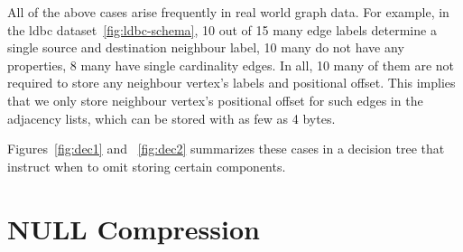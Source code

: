All of the above cases arise frequently in real world graph data. For example, in the \gls{ldbc} dataset~\ref{fig:ldbc-schema}, 10  out of 15 many edge labels determine a single source and destination neighbour label, 10 many do not have any properties, 8 many have single cardinality edges. In all, 10 many of them are not required to store any neighbour vertex's labels and positional offset. This implies that we only store neighbour vertex's positional offset for such edges in the adjacency lists, which can be stored with as few as 4 bytes.

Figures~\ref{fig:dec1} and ~\ref{fig:dec2} summarizes these cases in a decision tree that instruct when to omit storing certain components.



\section{NULL Compression}
\label{sec:null}

